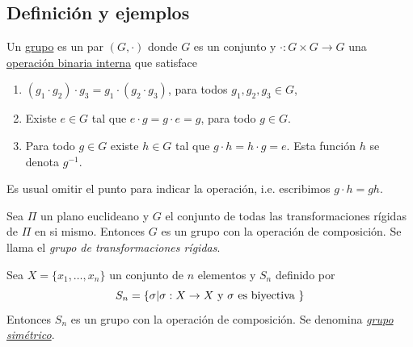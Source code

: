  \subsection{Definición y ejemplos}
\begin{definicion}[Grupo]
Un \href{https://es.wikipedia.org/wiki/Grupo_(matem%C3%A1tica)}{grupo} es un par $(G,\cdot)$ donde $G$ es un conjunto y $\cdot :G\times G\to G$ una \href{https://es.wikipedia.org/wiki/Operaci%C3%B3n_matem%C3%A1tica}{operación binaria interna} que satisface
\begin{enumerate}
\item $(g_1\cdot g_2)\cdot g_3=g_1\cdot (g_2\cdot g_3)$, para todos $g_1,g_2,g_3\in G$,
\item Existe $e\in G$ tal que $e\cdot g=g\cdot e=g$,  para todo $g\in G$.
\item Para todo $g\in G$ existe $h\in G$ tal que $g\cdot h=h\cdot g=e$. Esta función $h$ se denota  $g^{-1}$.
\end{enumerate}
\end{definicion}

Es usual omitir el punto para indicar la operación, i.e. escribimos $g\cdot h=gh$.



\begin{ejemplo}{} Sea $\Pi$ un plano euclideano y $G$ el conjunto de todas las transformaciones rígidas de $\Pi$ en si mismo. Entonces $G$ es un grupo con la operación de composición. Se llama el \emph{grupo de transformaciones rígidas}.
 \end{ejemplo}


\begin{ejemplo}{}  Sea $X=\{x_1,\ldots,x_n\}$ un conjunto de $n$ elementos y $S_n$ definido por
\[S_n=\{\sigma|\sigma:X\to X\hbox{ y }\sigma \hbox{ es biyectiva }\}\]
Entonces $S_n$ es un grupo  con la operación de composición. Se denomina \href{http://es.wikipedia.org/wiki/Grupo_simétrico}{\emph{grupo simétrico}}.
 \end{ejemplo}

